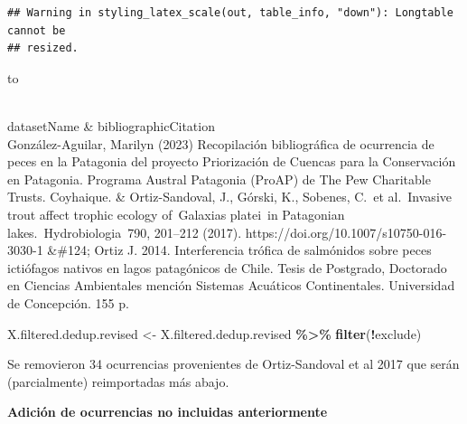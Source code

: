 \documentclass[sn-apa,pdflatex]{sn-jnl}
\newenvironment{Shaded}{\begin{snugshade}}{\end{snugshade}}
\newcommand{\FunctionTok}[1]{\textcolor[rgb]{0.13,0.29,0.53}{\textbf{#1}}}
\newcommand{\NormalTok}[1]{#1}
\newcommand{\OtherTok}[1]{\textcolor[rgb]{0.56,0.35,0.01}{#1}}
\newcommand{\SpecialCharTok}[1]{\textcolor[rgb]{0.81,0.36,0.00}{\textbf{#1}}}
\begin{document}
\begin{verbatim}
## Warning in styling_latex_scale(out, table_info, "down"): Longtable cannot be
## resized.
\end{verbatim}

\begingroup\fontsize{8}{10}\selectfont

\begin{longtabu} to 
\caption{\label{tab:unnamed-chunk-234}La siguientes instancias de Ortiz-Sandoval et al. 2017 fue sustituidas en este adendum.}\\
\toprule
datasetName & bibliographicCitation\\
\midrule
González-Aguilar, Marilyn (2023) Recopilación bibliográfica de ocurrencia de peces en la Patagonia del proyecto Priorización de Cuencas para la Conservación en Patagonia. Programa Austral Patagonia (ProAP) de The Pew Charitable Trusts. Coyhaique. & Ortiz-Sandoval, J., Górski, K., Sobenes, C. et al. Invasive trout affect trophic ecology of Galaxias platei in Patagonian lakes. Hydrobiologia 790, 201–212 (2017). https://doi.org/10.1007/s10750-016-3030-1   \&\#124;    Ortiz J. 2014. Interferencia trófica de salmónidos sobre peces ictiófagos nativos en lagos patagónicos de Chile. Tesis de Postgrado, Doctorado en Ciencias Ambientales mención Sistemas Acuáticos Continentales. Universidad de Concepción. 155 p.\\
\bottomrule
\end{longtabu}
\endgroup{}

\begin{Shaded}
\begin{Highlighting}[]
\NormalTok{X.filtered.dedup.revised }\OtherTok{\textless{}{-}}\NormalTok{ X.filtered.dedup.revised }\SpecialCharTok{\%\textgreater{}\%}
    \FunctionTok{filter}\NormalTok{(}\SpecialCharTok{!}\NormalTok{exclude)}
\end{Highlighting}
\end{Shaded}

Se removieron 34 ocurrencias provenientes de Ortiz-Sandoval et al 2017
que serán (parcialmente) reimportadas más abajo.

\textbf{Adición de ocurrencias no incluidas anteriormente}
\end{document}
